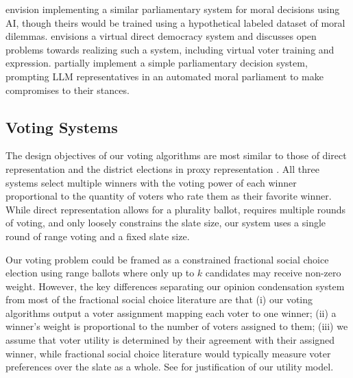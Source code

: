 \documentclass[11pt]{article}
\begin{document}
\citet{conitzer-2017-moral-ai} envision implementing a similar parliamentary system for moral decisions using AI, though theirs would be trained using a hypothetical labeled dataset of moral dilemmas. \citet{grandi-agent-mediated} envisions a virtual direct democracy system and discusses open problems towards realizing such a system, including virtual voter training and expression. \citet{ouwerx-parliaments} partially implement a simple parliamentary decision system, prompting LLM representatives in an automated moral parliament to make compromises to their stances. 

\subsection{Voting Systems}
The design objectives of our voting algorithms are most similar to those of direct representation \citep{direct-representation} and the district elections in proxy representation \citep{proxy-representation}. All three systems select multiple winners with the voting power of each winner proportional to the quantity of voters who rate them as their favorite winner. While direct representation allows for a plurality ballot, requires multiple rounds of voting, and only loosely constrains the slate size, our system uses a single round of range voting and a fixed slate size. 

Our voting problem could be framed as a constrained fractional social choice \citep{aziz-randomized-2015} election using range ballots where only up to $k$ candidates may receive non-zero weight. However, the key differences separating our opinion condensation system from most of the fractional social choice literature are that (i) our voting algorithms output a voter assignment mapping each voter to one winner; (ii) a winner’s weight is proportional to the number of voters assigned to them; (iii) we assume that voter utility is determined by their agreement with their assigned winner, while fractional social choice literature would typically measure voter preferences over the slate as a whole. See  for justification of our utility model.
\end{document}
